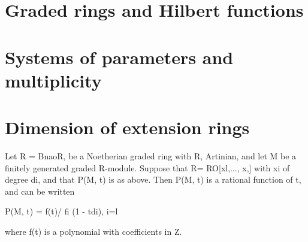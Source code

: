 
\section{Graded rings and Hilbert functions}
\section{Systems of parameters and multiplicity}
\section{Dimension of extension rings}

\begin{theorem}[Theorem 13.2]\label{mcrt-auto-theorem-13-2}\uses{}
\begin{mathematicalrecord}
Let R = BnaoR, be a Noetherian graded ring with R,
Artinian, and let M be a finitely generated graded R-module. Suppose that
R= RO[xl,..., x,] with xi of degree di, and that P(M, t) is as above. Then
P(M, t) is a rational function of t, and can be written

        P(M, t) = f(t)/ fi (1 - tdi),
                        i=l

where f(t) is a polynomial with coefficients in Z.
\end{mathematicalrecord}
\end{theorem}
